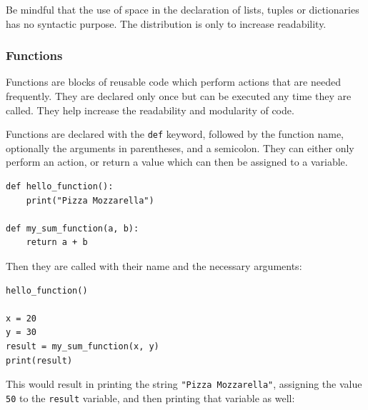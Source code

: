 \documentclass[a4paper,12pt]{article}
\begin{document}
Be mindful that the use of space in the declaration of lists, tuples or dictionaries has no syntactic purpose. The distribution is only to increase readability.

\subsubsection{Functions}

Functions are blocks of reusable code which perform actions that are needed frequently. They are declared only once but can be executed any time they are called. They help increase the readability and modularity of code.

Functions are declared with the \verb|def| keyword, followed by the function name, optionally the arguments in parentheses, and a semicolon. They can either only perform an action, or return a value which can then be assigned to a variable.

\begin{tcolorbox}[
    enhanced,
    attach boxed title to top left={xshift=6mm,yshift=-3mm},
    colback=lightgreen!20,
    colframe=lightgreen,
    colbacktitle=lightgreen,
    title=Python,
    fonttitle=\bfseries\color{black},
    boxed title style={size=small,colframe=lightgreen,sharp corners},
    sharp corners,
    ]
    \begin{verbatim}
def hello_function():
    print("Pizza Mozzarella")

def my_sum_function(a, b):
    return a + b
    \end{verbatim}
\end{tcolorbox}

Then they are called with their name and the necessary arguments:

\begin{tcolorbox}[
    enhanced,
    attach boxed title to top left={xshift=6mm,yshift=-3mm},
    colback=lightgreen!20,
    colframe=lightgreen,
    colbacktitle=lightgreen,
    title=Python,
    fonttitle=\bfseries\color{black},
    boxed title style={size=small,colframe=lightgreen,sharp corners},
    sharp corners,
    ]
    \begin{verbatim}
hello_function()

x = 20
y = 30
result = my_sum_function(x, y)
print(result)
    \end{verbatim}
\end{tcolorbox}

This would result in printing the string \verb|"Pizza Mozzarella"|, assigning the value \verb|50| to the \verb|result| variable, and then printing that variable as well:
\end{document}
